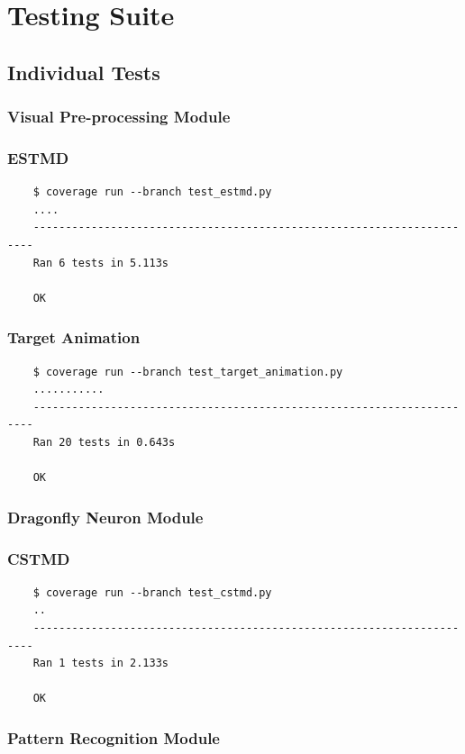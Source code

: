 \documentclass[a4paper,11pt]{article}
\begin{document}
\clearpage
\section{Testing Suite}
\subsection{Individual Tests}
\subsubsection{Visual Pre-processing Module}
\subsubsection*{{\hspace{6mm}}ESTMD}
\begin{verbatim}
    $ coverage run --branch test_estmd.py
    ....
    ----------------------------------------------------------------------
    Ran 6 tests in 5.113s

    OK
\end{verbatim}
\subsubsection*{{\hspace{6mm}}Target Animation}
\begin{verbatim}
    $ coverage run --branch test_target_animation.py
    ...........
    ----------------------------------------------------------------------
    Ran 20 tests in 0.643s

    OK
\end{verbatim}

\subsubsection{Dragonfly Neuron Module}
\subsubsection*{{\hspace{6mm}}CSTMD}
\begin{verbatim}
    $ coverage run --branch test_cstmd.py
    ..
    ----------------------------------------------------------------------
    Ran 1 tests in 2.133s

    OK
\end{verbatim}

\subsubsection{Pattern Recognition Module}
\end{document}
